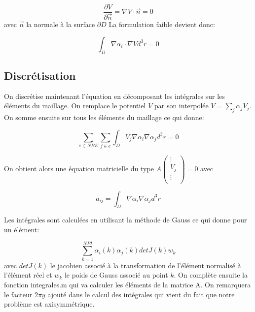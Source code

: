 \documentclass[a4paper,12pt]{article}
\begin{document}
\[
\frac{\partial V}{\partial \vec{n} } = \nabla V \cdot \vec{n} = 0
\]avec $\vec{n}$ la normale à la surface $\partial D$
La formulation faible devient donc:

\[
\int_{D} \nabla \alpha_i \cdot \nabla V d^3 r = 0
\]

\subsection{Discrétisation}
On discrétise maintenant l'équation en décomposant les intégrales sur les éléments du maillage. On remplace le potentiel $V$ par son interpolée $V = \sum_{j} \alpha_j V_j$. On somme ensuite sur tous les éléments du maillage ce qui donne:

\[
\sum_{e \in NBE} \sum_{j \in e} \int_{D} V_j \nabla \alpha_i \nabla \alpha_j d^3 r = 0
\]

On obtient alors une équation matricielle du type $A 
\left( \begin{array}{c}
\vdots \\
V_j \\
\vdots \\
\end{array} \right) 
 = 0$ avec

 \[
 a_{ij} = \int_{D} \nabla \alpha_i \nabla \alpha_j d^3 r 
\]

\medskip

Les intégrales sont calculées en utilisant la méthode de Gauss ce qui donne pour un élément:

\[
\sum_{k=1}^{NPI} \alpha_i (k) \alpha_j (k) detJ(k) w_k
\]avec $detJ(k)$ le jacobien associé à la transformation de l'élément normalisé à l'élément réel et $w_k$ le poids de Gauss associé au point $k$. On complète ensuite la fonction integrales.m qui va calculer les éléments de la matrice A. On remarquera le facteur $2 \pi y$ ajouté dans le calcul des intégrales qui vient du fait que notre problème est axisymmétrique.

%





%      

%            
%                
%                
\end{document}
